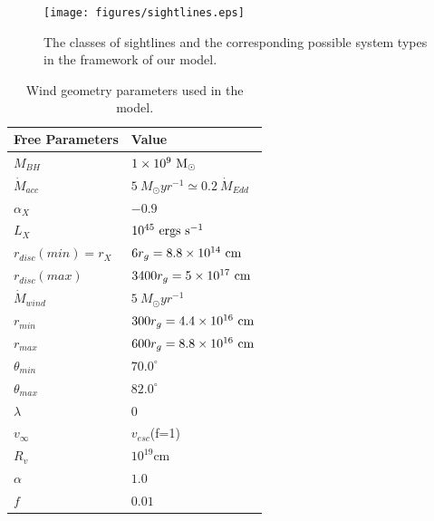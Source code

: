 \documentclass[preprint, a4paper, 11pt]{aastex}
\begin{document}
\begin{figure}
\centering
\texttt{[image: figures/sightlines.eps]}
\caption
{
The classes of sightlines and the corresponding possible 
system types in the framework of our model.
}
\label{fig:lobal}
\end{figure}




\begin{table}
\begin{tabular}{p{3cm}p{4cm}}
\hline Free Parameters 	&	 Value \\ 
\hline \hline 
$M_{BH}$ 	 &	 $1\times 10^9~\rm{M_{\odot}}$ \\ 
$\dot{M}_{acc}$ 	 &	 $5~M_{\odot}yr^{-1} \simeq 0.2~\dot{M}_{Edd}$\\ 
$\alpha_X$ 	 &	 $-0.9$ \\ 
$L_{X} $ 	 &	 $10^{45}~\rm{ergs~s^{-1}}$\\ 
$r_{disc}(min)=r_{X}$   &	 $6r_g=8.8\times10^{14}~{\rm cm}$ \\ 
$r_{disc}(max)$   &	 $3400r_g = 5\times10^{17}~{\rm cm}$ \\ 
$\dot{M}_{wind}$  &	 $5~M_{\odot}yr^{-1}$ \\ 
$r_{min}$ 	&	 $300r_{g} = 4.4\times10^{16}~{\rm cm}$\\ 
$r_{max}$ 	&	 $600r_{g} = 8.8\times10^{16}~{\rm cm}$ \\ 
$\theta_{min}$ 	&	 $70.0^{\circ}$ \\ 
$\theta_{max}$ 	&	 $82.0^{\circ}$ \\ 
$\lambda$ 	&	 $0$ \\ 
$v_{\infty}$ 	&	 $v_{esc}$(f=1) \\ 
$R_v$ 	        &	 $10^{19}$cm \\ 
$\alpha$ 	&	 $1.0$ \\
$f$ 	&	 $0.01$ \\
\hline 
\end{tabular}
\caption{Wind geometry parameters used in the model.}
\label{wind_param}
\end{table}
\end{document}
